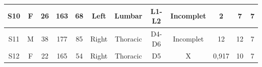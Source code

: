 \begin{landscape}
\begin{table}[h]
\begin{tabular}{|c|c|c|c|c|c|c|c|c|c|c|c|}
S10                                                    & F                                   & 26                                & 163                                       & 68                                        & Left                                                                                     & Lumbar                                                                                   & L1-L2                                                                                      & Incomplet                                                                                   & 2                                                                                               & 7                                                                                          & 7                                                                                          \\ \hline
S11                                                    & M                                   & 38                                & 177                                       & 85                                        & Right                                                                                    & Thoracic                                                                                 & D4-D6                                                                                      & Incomplet                                                                                   & 12                                                                                              & 12                                                                                         & 7                                                                                          \\ \hline
S12                                                    & F                                   & 22                                & 165                                       & 54                                        & Right                                                                                    & Thoracic                                                                                 & D5                                                                                         & X                                                                                           & 0,917                                                                                           & 10                                                                                         & 7                                                                                          \\ \hline

\end{tabular}
\end{table}
\end{landscape}
